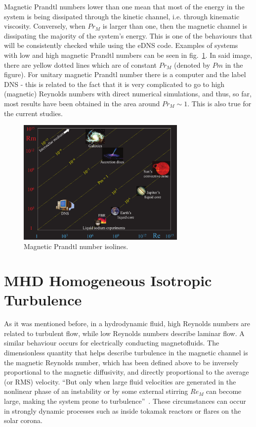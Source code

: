 \documentclass[a4paper,12pt]{article}
\begin{document}
Magnetic Prandtl numbers lower than one mean that most of the energy in the system is being dissipated through the kinetic channel, i.e. through kinematic viscosity. Conversely, when $Pr_M$ is larger than one, then the magnetic channel is dissipating the majority of the system's energy. This is one of the behaviours that will be consistently checked while using the eDNS code. Examples of systems with low and high magnetic Prandtl numbers can be seen in fig.~\ref{fig1}. In said image, there are yellow dotted lines which are of constant $Pr_M$ (denoted by $Pm$ in the figure). For unitary magnetic Prandtl number there is a computer and the label DNS - this is related to the fact that it is very complicated to go to high (magnetic) Reynolds numbers with direct numerical simulations, and thus, so far, most results have been obtained in the area around $Pr_M \sim 1$. This is also true for the current studies.

\begin{figure}[h!]
\centering
\includegraphics[width=0.73\textwidth]{img/PrM_spectrum}
\caption{Magnetic Prandtl number isolines.}
\label{fig1}
\end{figure}


\section{MHD Homogeneous Isotropic Turbulence}

As it was mentioned before, in a hydrodynamic fluid, high Reynolds numbers are related to turbulent flow, while low Reynolds numbers describe laminar flow. A similar behaviour occurs for electrically conducting magnetofluids. The dimensionless quantity that helps describe turbulence in the magnetic channel is the magnetic Reynolds number, which has been defined above to be inversely proportional to the magnetic diffusivity, and directly proportional to the average (or RMS) velocity. ``But only when large fluid velocities are generated in
the nonlinear phase of an instability or by some external stirring $Re_M$ can become large, making the system prone to turbulence''~\cite{biskamp1997nonlinear}. These circumstances can occur in strongly dynamic processes such as inside tokamak reactors or flares on the solar corona. 
\end{document}
